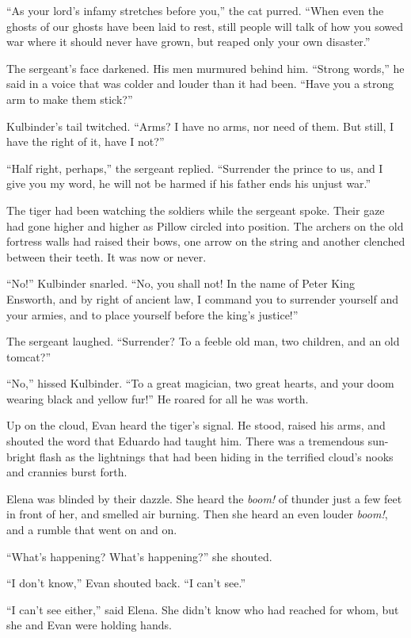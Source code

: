 \documentclass[10pt]{book}
\begin{document}
``As your lord's infamy stretches before you,'' the cat purred. ``When even the ghosts of our ghosts have been laid to rest, still people will talk of how you sowed war where it should never have grown, but reaped only your own disaster.''

The sergeant's face darkened. His men murmured behind him. ``Strong words,'' he said in a voice that was colder and louder than it had been. ``Have you a strong arm to make them stick?''

Kulbinder's tail twitched. ``Arms? I have no arms, nor need of them. But still, I have the right of it, have I not?''

``Half right, perhaps,'' the sergeant replied. ``Surrender the prince to us, and I give you my word, he will not be harmed if his father ends his unjust war.''

The tiger had been watching the soldiers while the sergeant spoke. Their gaze had gone higher and higher as Pillow circled into position. The archers on the old fortress walls had raised their bows, one arrow on the string and another clenched between their teeth. It was now or never.

``No!'' Kulbinder snarled. ``No, you shall not!  In the name of Peter King Ensworth, and by right of ancient law, I command you to surrender yourself and your armies, and to place yourself before the king's justice!''

The sergeant laughed. ``Surrender? To a feeble old man, two children, and an old tomcat?''

``No,'' hissed Kulbinder. ``To a great magician, two great hearts, and your doom wearing black and yellow fur!'' He roared for all he was worth.

Up on the cloud, Evan heard the tiger's signal. He stood, raised his arms, and shouted the word that Eduardo had taught him. There was a tremendous sun-bright flash as the lightnings that had been hiding in the terrified cloud's nooks and crannies burst forth.

Elena was blinded by their dazzle. She heard the \emph{boom!} of thunder just a few feet in front of her, and smelled air burning. Then she heard an even louder \emph{boom!}, and a rumble that went on and on.

``What's happening? What's happening?'' she shouted.

``I don't know,'' Evan shouted back. ``I can't see.''

``I can't see either,'' said Elena. She didn't know who had reached for whom, but she and Evan were holding hands.
\end{document}
